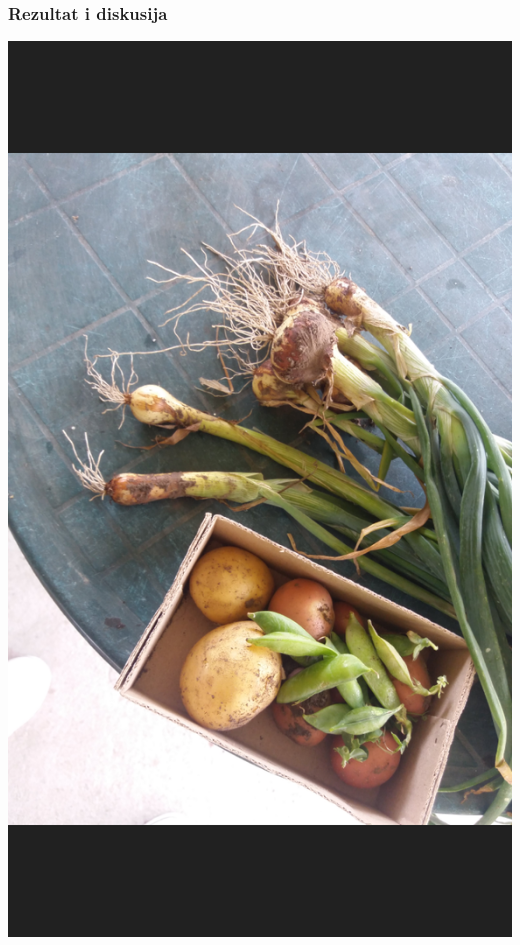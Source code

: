 \documentclass{beamer}
\begin{document}
\begin{frame}
  \frametitle{Rezultat i diskusija}
  \includegraphics[height=0.85\textheight]{slike/basta1}\centering
\end{frame}
\end{document}

